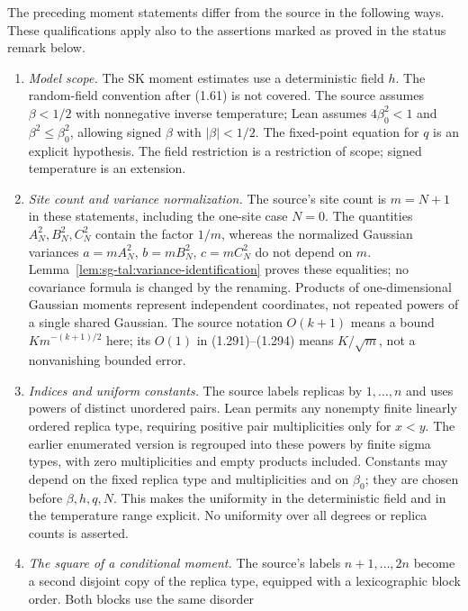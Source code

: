 \begin{remark}
\label{rem:sg-tal:dev-110-moments}
The preceding moment statements differ from the source in the following ways.
These qualifications apply also to the assertions marked as proved in the status
remark below.
\begin{enumerate}
\item \emph{Model scope.}
The SK moment estimates use a deterministic field $h$. The random-field convention
after (1.61) is not covered. The source assumes $\beta<1/2$ with nonnegative inverse
temperature; Lean assumes $4\beta_0^2<1$ and $\beta^2\le\beta_0^2$, allowing signed
$\beta$ with $|\beta|<1/2$. The fixed-point equation for $q$ is an explicit hypothesis.
The field restriction is a restriction of scope; signed temperature is an extension.
\item \emph{Site count and variance normalization.}
The source's site count is $m=N+1$ in these statements, including the one-site case
$N=0$. The quantities $A_N^2,B_N^2,C_N^2$ contain the factor $1/m$, whereas the
normalized Gaussian variances $a=mA_N^2$, $b=mB_N^2$, $c=mC_N^2$ do not depend on $m$.
Lemma~\ref{lem:sg-tal:variance-identification} proves these equalities; no covariance
formula is changed by the renaming. Products of one-dimensional Gaussian moments
represent independent coordinates, not repeated powers of a single shared Gaussian.
The source notation $O(k+1)$ means a bound $K m^{-(k+1)/2}$ here; its $O(1)$ in
(1.291)--(1.294) means $K/\sqrt m$, not a nonvanishing bounded error.
\item \emph{Indices and uniform constants.}
The source labels replicas by $1,\ldots,n$ and uses powers of distinct unordered
pairs. Lean permits any nonempty finite linearly ordered replica type, requiring
positive pair multiplicities only for $x<y$. The earlier enumerated version is
regrouped into these powers by finite sigma types, with zero multiplicities and
empty products included. Constants may depend on the fixed replica type and
multiplicities and on $\beta_0$; they are chosen before $\beta,h,q,N$.
This makes the uniformity in the deterministic field and in the temperature range
explicit. No uniformity over all degrees or replica counts is asserted.
\item \emph{The square of a conditional moment.}
The source's labels $n+1,\ldots,2n$ become a second disjoint copy of the replica
type, equipped with a lexicographic block order. Both blocks use the same disorder

\end{enumerate}
\end{remark}
